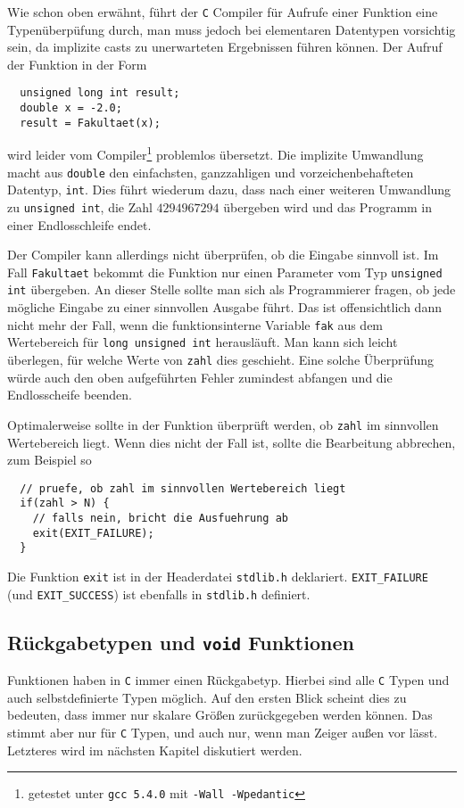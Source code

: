 Wie schon oben erwähnt, führt der \texttt{C} Compiler für Aufrufe einer Funktion eine Typenüberpüfung durch, man muss jedoch bei elementaren Datentypen vorsichtig sein, da implizite casts zu unerwarteten Ergebnissen führen können.
Der Aufruf der Funktion in der Form
\begin{lstlisting}
  unsigned long int result;
  double x = -2.0;
  result = Fakultaet(x);
\end{lstlisting}
wird leider vom Compiler\footnote{getestet unter \texttt{gcc 5.4.0} mit \texttt{-Wall -Wpedantic}} problemlos übersetzt.
Die implizite Umwandlung macht aus \texttt{double} den einfachsten, ganzzahligen und vorzeichenbehafteten Datentyp, \texttt{int}.
Dies führt wiederum dazu, dass nach einer weiteren Umwandlung zu \texttt{unsigned int}, die Zahl $4294967294$ übergeben wird und das Programm in einer Endlosschleife endet.

Der Compiler kann allerdings nicht überprüfen, ob die Eingabe sinnvoll ist.
Im Fall \verb|Fakultaet| bekommt die Funktion nur einen Parameter vom Typ \verb|unsigned int| übergeben. 
An dieser Stelle sollte man sich als Programmierer fragen, ob jede mögliche Eingabe zu einer sinnvollen Ausgabe führt. 
Das ist offensichtlich dann nicht mehr der Fall, wenn die funktionsinterne Variable \verb|fak| aus dem Wertebereich für \verb|long unsigned int| herausläuft. 
Man kann sich leicht überlegen, für welche Werte von \verb|zahl| dies geschieht.
Eine solche Überprüfung würde auch den oben aufgeführten Fehler zumindest abfangen und die Endlosscheife beenden.

Optimalerweise sollte in der Funktion überprüft werden, ob \verb|zahl| im sinnvollen Wertebereich liegt. 
Wenn dies nicht der Fall ist, sollte die Bearbeitung abbrechen, zum Beispiel so
\begin{lstlisting}
  // pruefe, ob zahl im sinnvollen Wertebereich liegt
  if(zahl > N) {
    // falls nein, bricht die Ausfuehrung ab
    exit(EXIT_FAILURE);
  }
\end{lstlisting}
Die Funktion \verb|exit| ist in der Headerdatei \verb|stdlib.h| deklariert.
\verb|EXIT_FAILURE| (und \verb|EXIT_SUCCESS|) ist ebenfalls in \verb|stdlib.h| definiert.

\subsection{Rückgabetypen und \texttt{void} Funktionen}

Funktionen haben in \texttt{C} immer einen Rückgabetyp.
Hierbei sind alle \texttt{C} Typen und auch selbstdefinierte Typen möglich.
Auf den ersten Blick scheint dies zu bedeuten, dass immer nur skalare Größen zurückgegeben werden können.
Das stimmt aber nur für \texttt{C} Typen, und auch nur, wenn man Zeiger außen vor lässt.
Letzteres wird im nächsten Kapitel diskutiert werden.

